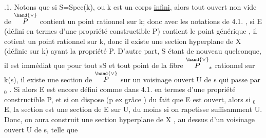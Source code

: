 .1. Notons que si S=Spec(k), ou k est un corps \uline{infini}, alors tout ouvert
non vide de $\overset{\hand{\vee}}{P}$ contient un point rationnel sur k; donc avec les notations de
4.1. , si E (défini en termes d'une propriété constructible P) contient
le point générique \hand{$\eta$} , il cotient  un point rationnel sur k, donc
il existe une section hyperplane de X (définie sur k) ayant la propriété P.
D'autre part, S étant de nouveau quelconque, il est immédiat que pour tout
s\hand{$\in$}S et tout point de la fibre $\overset{\hand{\vee}}{P}_s$ rationnel sur k(s), il existe une section
\hand{$\xi$} de $\overset{\hand{\vee}}{P}$ sur un voisinage ouvert U de s qui passe par \hand{$\xi$}$_0$ . Si alors E est
encore  défini comme dans 4.1. en termes d'une propriété constructible
P, et si on dispose (p ex grâce ) du fait que E est ouvert, alors
si \hand{$\xi$}$_0$\hand{$\in$} E,  la section \hand{$\xi$} est une section de E sur 
U, du moins si on rapetisse suffisamment U. Donc, on aura construit une
section hyperplane de X , au dessus d'un voisinage ouvert U de s, telle que

